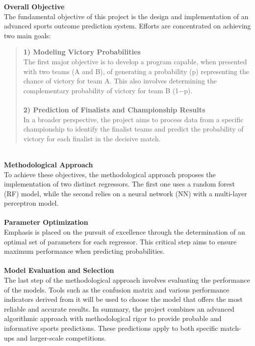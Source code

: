 \textbf{Overall Objective}\\
The fundamental objective of this project is the design and implementation of an advanced sports outcome prediction system. Efforts are concentrated on achieving two main goals:\\
\begin{quote}
\textbf{1) Modeling Victory Probabilities}\\
The first major objective is to develop a program capable, when presented with two teams (A and B), of generating a probability (p) representing the chance of victory for team A. This also involves determining the complementary probability of victory for team B (1−p).\\

\\
\textbf{2) Prediction of Finalists and Championship Results}\\
In a broader perspective, the project aims to process data from a specific championship to identify the finalist teams and predict the probability of victory for each finalist in the decisive match.\\
\end{quote}
\\
\textbf{Methodological Approach}\\
To achieve these objectives, the methodological approach proposes the implementation of two distinct regressors. The first one uses a random forest (RF) model, while the second relies on a neural network (NN) with a multi-layer perceptron model.\\
\\
\textbf{Parameter Optimization}\\
Emphasis is placed on the pursuit of excellence through the determination of an optimal set of parameters for each regressor. This critical step aims to ensure maximum performance when predicting probabilities.\\
\\
\textbf{Model Evaluation and Selection}\\
The last step of the methodological approach involves evaluating the performance of the models. Tools such as the confusion matrix and various performance indicators derived from it will be used to choose the model that offers the most reliable and accurate results. In summary, the project combines an advanced algorithmic approach with methodological rigor to provide probable and informative sports predictions. These predictions apply to both specific match-ups and larger-scale competitions.
